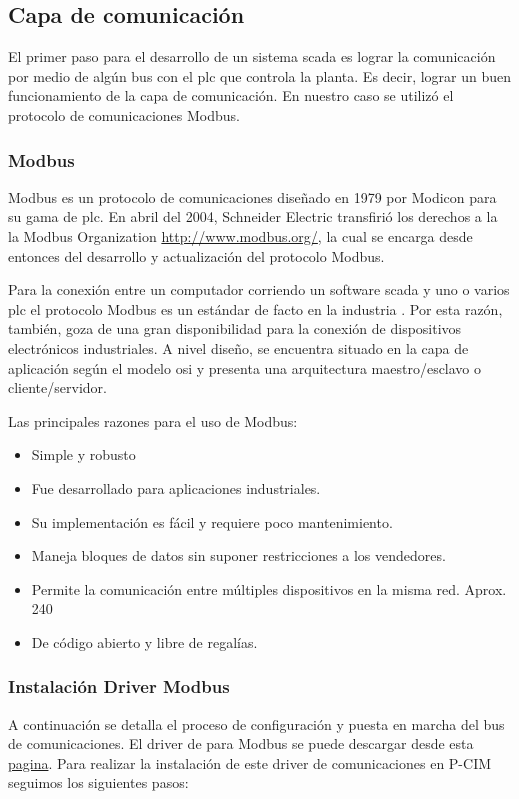 \subsection{Capa de comunicación}
\label{subsec:CapaComunicacion}
El primer paso para el desarrollo de un sistema \gls{scada} es lograr la comunicación por medio
de algún bus con el \gls{plc} que controla la planta. Es decir, lograr un buen funcionamiento de 
la capa de comunicación. 
En nuestro caso se utilizó el protocolo de comunicaciones Modbus. 

\subsubsection{Modbus}
Modbus es un protocolo de comunicaciones diseñado en 1979 por Modicon para su gama de \gls{plc}.
En abril del 2004, Schneider Electric transfirió los derechos a la la Modbus Organization 
\url{http://www.modbus.org/}, la cual se encarga desde entonces del desarrollo y actualización 
del protocolo Modbus.

Para la conexión entre un computador corriendo un software \gls{scada} y uno o varios \gls{plc} 
el protocolo Modbus es un estándar de facto en la industria . Por esta razón, también, 
goza de una gran disponibilidad para la conexión de dispositivos electrónicos industriales. 
A nivel diseño, se encuentra situado en la capa de aplicación según el modelo \gls{osi} y 
presenta una arquitectura maestro/esclavo o cliente/servidor.

Las principales razones para el uso de Modbus:
\begin{itemize}
 \item Simple y robusto
 \item Fue desarrollado para aplicaciones industriales.
 \item Su implementación es fácil y requiere poco mantenimiento.
 \item Maneja bloques de datos sin suponer restricciones a los vendedores.
 \item Permite la comunicación entre múltiples dispositivos en la misma red. Aprox. 240
 \item De código abierto y libre de regalías.%
\end{itemize}


\subsubsection{Instalación Driver Modbus}
A continuación se detalla el  proceso de configuración y puesta en marcha del bus de comunicaciones. 
El driver de para Modbus se puede descargar desde esta 
\href{http://www.afcon-inc.com/afcon/Templates/showpage.asp?TMID=402&FID=832}{pagina}.
Para realizar la instalación de este driver de comunicaciones en P-CIM seguimos los siguientes pasos: 

